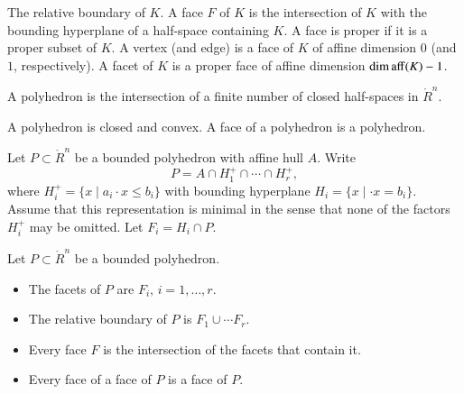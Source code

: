 {{\begin{definition}
The relative boundary of $K$.  A face $F$ of $K$ is the intersection of $K$ with the bounding hyperplane of a half-space containing $K$.  A face is proper if it is a proper subset of $K$.    A vertex (and edge) is a face of $K$ of affine dimension $0$ (and $1$, respectively).   A facet of $K$ is a proper face of affine dimension $\operatorname{dim\,aff}(K)-1$.
\end{definition}

%

\begin{definition}[polyhedron]  A polyhedron is the intersection of
a finite number of closed half-spaces in $\ring{R}^n$.
\end{definition}

A polyhedron is closed and convex.  A face of a polyhedron is a polyhedron. %

Let $P\subset\ring{R}^n$ be a bounded polyhedron with affine hull $A$. Write 
$$
P = A \cap H^+_1 \cap \cdots \cap H^+_r,
$$
where
$H^+_i = \{x\mid a_i\cdot x \le b_i\}$ with bounding hyperplane
$H_i=\{x\mid \cdot x = b_i\}$. Assume that this representation is minimal in the sense that none of the factors $H^+_i$ may be omitted.  Let $F_i = H_i\cap P$.


\begin{lemma}\label{lemma:webster}  
Let $P\subset\ring{R}^n$ be a bounded polyhedron.
\begin{itemize}
\item The facets of $P$ are $F_i$, $i=1,\ldots,r$.
\item The relative boundary of $P$ is $F_1\cup\cdots F_r$.
\item Every face $F$ is the intersection of the facets that contain it.
\item Every face of a face of $P$ is a face of $P$.
\end{itemize}
\end{lemma}

}}

